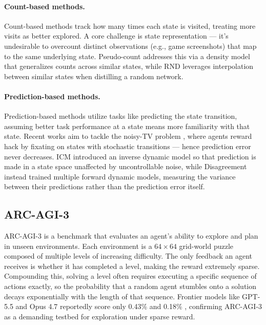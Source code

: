\documentclass{article}
\begin{document}
\paragraph{Count-based methods.} Count-based methods \citep{bellemare_unifying_2016, burda_exploration_2018, ostrovski_count-based_2017} track how many times each state is visited, treating more visits as better explored. A core challenge is state representation --- it's undesirable to overcount distinct observations (e.g., game screenshots) that map to the same underlying state. Pseudo-count \citep{bellemare_unifying_2016} addresses this via a density model that generalizes counts across similar states, while RND \citep{burda_exploration_2018} leverages interpolation between similar states when distilling a random network.

\paragraph{Prediction-based methods.} Prediction-based methods \citep{pathak_curiosity-driven_2017, burda_large-scale_2018, achiam_surprise-based_2017} utilize tasks like predicting the state transition, assuming better task performance at a state means more familiarity with that state. Recent works aim to tackle the noisy-TV problem \citep{burda_large-scale_2018}, where agents reward hack by fixating on states with stochastic transitions --- hence prediction error never decreases. ICM \citep{pathak_curiosity-driven_2017} introduced an inverse dynamic model so that prediction is made in a state space unaffected by uncontrollable noise, while Disagreement \citep{pathak_self-supervised_2019} instead trained multiple forward dynamic models, measuring the variance between their predictions rather than the prediction error itself.

\subsection{ARC-AGI-3}
ARC-AGI-3 \citep{foundation_arc-agi-3_2026} is a benchmark that evaluates an agent's ability to explore and plan in unseen environments. Each environment is a $64\times64$ grid-world puzzle composed of multiple levels of increasing difficulty. The only feedback an agent receives is whether it has completed a level, making the reward extremely sparse. Compounding this, solving a level often requires executing a specific sequence of actions exactly, so the probability that a random agent stumbles onto a solution decays exponentially with the length of that sequence. Frontier models like GPT-5.5 and Opus 4.7 reportedly score only 0.43\% and 0.18\% \citep{noauthor_analyzing_nodate}, confirming ARC-AGI-3 as a demanding testbed for exploration under sparse reward.
\end{document}
